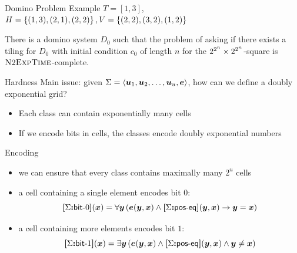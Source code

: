 \documentclass{beamer}
\begin{document}
\begin{frame}{Domino Problem}
Example $T = [1,3]$, $H = \left\{(1,3),(2,1),(2,2)\right\}, V = \left\{(2,2),(3,2),(1,2)\right\}$

\centering
{}

\begin{theorem}
There is a domino system $D_0$ such that the problem of asking if there exists a
tiling for $D_0$ with initial condition $c_0$ of length $n$ for the
$2^{2^n}\times 2^{2^n}$-square is $\text{\normalfont{\scshape N}}2\text{\normalfont{\scshape ExpTime}}$-complete.
\end{theorem}
\end{frame}

\begin{frame}{Hardness}
Main issue: given $\Sigma = \left\langle \bm{u}_{1},\bm{u}_{2},\dots,\bm{u}_{u},\bm{e} \right\rangle$,
how can we define a doubly exponential grid?
\pause
\begin{itemize}
  \item
  Each class can contain exponentially many cells
  
  \item
  If we encode bits in cells, the classes encode doubly exponential numbers
\end{itemize}
\end{frame}

\begin{frame}{Encoding}
\begin{itemize}
  \item
  we can ensure that every class contains maximally many $2^u$ cells
  
  \item
  a cell containing a single element encodes bit $0$:
  \[
    {\bm{[}\Sigma\mathord{\bm{:}}\mathsf{bit}{\hbox{-}}0\bm{]}}(\bm{x}) = \forall\bm{y} \left(
    \bm{e}(\bm{y},\bm{x}) \land {\bm{[}\Sigma\mathord{\bm{:}}\mathsf{pos}{\hbox{-}}\mathsf{eq}\bm{]}}(\bm{y},\bm{x}) \rightarrow \bm{y} = \bm{x}\right)
  \] 
  
  \item
  a cell containing more elements encodes bit $1$:
  \[
    {\bm{[}\Sigma\mathord{\bm{:}}\mathsf{bit}{\hbox{-}}1\bm{]}}(\bm{x}) = \exists\bm{y} \left(
    \bm{e}(\bm{y},\bm{x}) \land {\bm{[}\Sigma\mathord{\bm{:}}\mathsf{pos}{\hbox{-}}\mathsf{eq}\bm{]}}(\bm{y},\bm{x}) \land \bm{y} \neq \bm{x}\right)
  \]
\end{itemize}
\end{frame}
\end{document}

